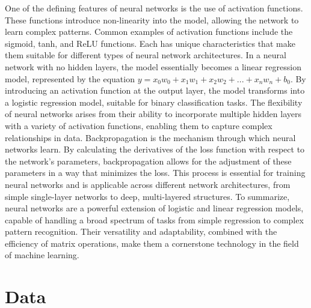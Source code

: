 \documentclass[twoside,11pt]{report}
\begin{document}
    One of the defining features of neural networks is the use of activation functions. These functions introduce 
    non-linearity into the model, allowing the network to learn complex patterns. Common examples of activation 
    functions include the sigmoid, tanh, and ReLU functions. Each has unique characteristics that make them suitable 
    for different types of neural network architectures.
    In a neural network with no hidden layers, the model essentially becomes a linear regression model, represented by 
    the equation $y = x_0w_0 + x_1w_1 + x_2w_2 + ... + x_nw_n + b_0$. By introducing an activation function at the 
    output layer, the model transforms into a logistic regression model, suitable for binary classification tasks. 
    The flexibility of neural networks arises from their ability to incorporate multiple hidden layers with a variety 
    of activation functions, enabling them to capture complex relationships in data.
    Backpropagation is the mechanism through which neural networks learn. By calculating the derivatives of the loss 
    function with respect to the network's parameters, backpropagation allows for the adjustment of these parameters 
    in a way that minimizes the loss. This process is essential for training neural networks and is applicable across 
    different network architectures, from simple single-layer networks to deep, multi-layered structures.
    To summarize, neural networks are a powerful extension of logistic and linear regression models, capable of 
    handling a broad spectrum of tasks from simple regression to complex pattern recognition. Their versatility and 
    adaptability, combined with the efficiency of matrix operations, make them a cornerstone technology in the field 
    of machine learning.



\section{Data}
\label{sec:data}
\end{document}
